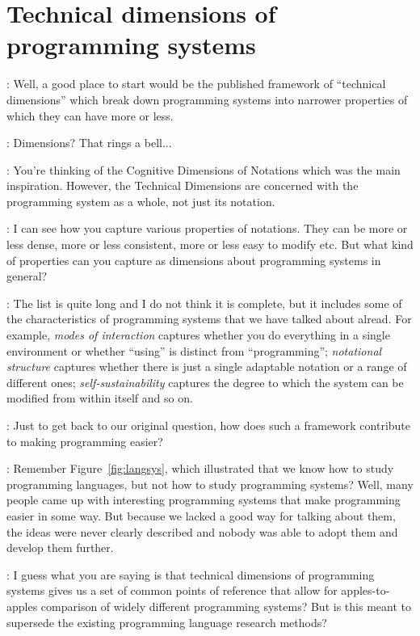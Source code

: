 \documentclass[runningheads]{llncs}
\newcommand{\T}{Tomas}
\newcommand{\J}{Joel}
\newcommand{\says}[2][gg]{\vspace{0.5em}\noindent\hangindent=0.5cm{\textsc{#1}}: #2}
\begin{document}
\section{Technical dimensions of programming systems}

\says[\J]{Well, a good place to start would be the published framework of ``technical dimensions''
\cite{jakubovic-2023-techdims} which break down programming systems into narrower properties of which they can have more or less.}

\says[\T]{Dimensions? That rings a bell...}

\says[\J]{You're thinking of the Cognitive Dimensions of Notations \cite{green-1990-cogdims} which was the main inspiration. However, the Technical Dimensions are concerned with the programming system as a whole, not just its notation.}

\says[\T]{I can see how you capture various properties of notations. They can be more or less
  dense, more or less consistent, more or less easy to modify etc. But what kind of properties
  can you capture as dimensions about programming systems in general?}

\says[\J]{The list is quite long and I do not think it is complete, but it includes some of the
  characteristics of programming systems that we have talked about alread. For example,
  \emph{modes of interaction} captures whether you do everything in a single environment or
  whether ``using'' is distinct from ``programming''; \emph{notational structure} captures whether
  there is just a single adaptable notation or a range of different ones; \emph{self-sustainability}
  captures the degree to which the system can be modified from within itself and so on.}

\says[\T]{Just to get back to our original question, how does such a framework contribute to making programming easier?}

\says[\J]{Remember Figure~\ref{fig:langsys}, which illustrated that we know how to study programming languages, but not how to study programming systems? Well, many people came up with interesting programming systems that make programming easier in some way. But because we lacked a good way for talking about them, the ideas were never clearly described and nobody was able to adopt them and develop them further.}

\says[\T]{I guess what you are saying is that technical dimensions of programming systems gives us a set of common points of reference that allow for apples-to-apples comparison of widely different programming systems? But is this meant to supersede the existing programming language research methods?}
\end{document}
